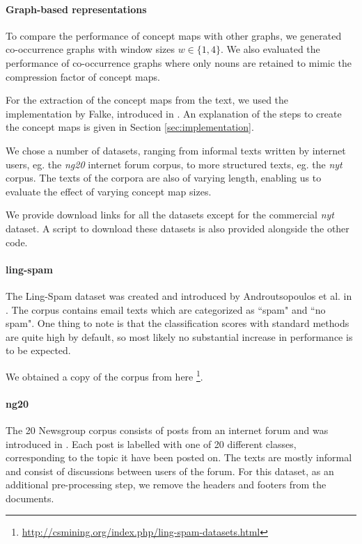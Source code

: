 \paragraph{Graph-based representations}
To compare the performance of concept maps with other graphs, we generated co-occurrence graphs with window sizes $w \in \{1, 4\}$.
We also evaluated the performance of co-occurrence graphs where only nouns are retained to mimic the compression factor of concept maps.

For the extraction of the concept maps from the text, we used the implementation by Falke, introduced in \cite{Falke2017}.
An explanation of the steps to create the concept maps is given in Section \ref{sec:implementation}.

We chose a number of datasets, ranging from informal texts written by internet users, eg.  the \textit{ng20} internet forum corpus, to more structured texts, eg. the \textit{nyt} corpus.
The texts of the corpora are also of varying length, enabling us to evaluate the effect of varying concept map sizes.

We provide download links for all the datasets except for the commercial \textit{nyt} dataset.
A script to download these datasets is also provided alongside the other code.

\paragraph{ling-spam}
The Ling-Spam dataset was created and introduced by Androutsopoulos et al. in  \cite{Androutsopoulos2000}.
The corpus contains email texts which are categorized as ``spam" and ``no spam".
One thing to note is that the classification scores with standard methods are quite high by default, so most likely no substantial increase in performance is to be expected.

We obtained a copy of the corpus from here \footnote{\url{http://csmining.org/index.php/ling-spam-datasets.html}}.


\paragraph{ng20}
The 20 Newsgroup corpus consists of posts from an internet forum and was introduced in \cite{Lang}. Each post is labelled with one of 20 different classes, corresponding to the topic it have been posted on. The texts are mostly informal and consist of discussions between users of the forum.
For this dataset, as an additional pre-processing step, we remove the headers and footers from the documents.

